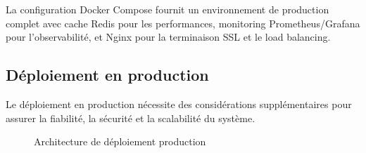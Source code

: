 La configuration Docker Compose fournit un environnement de production complet avec cache Redis pour les performances, monitoring Prometheus/Grafana pour l'observabilité, et Nginx pour la terminaison SSL et le load balancing.

\subsection{Déploiement en production}

Le déploiement en production nécessite des considérations supplémentaires pour assurer la fiabilité, la sécurité et la scalabilité du système.

\begin{figure}[h]
\centering
{}
\caption{Architecture de déploiement production}
\end{figure}

